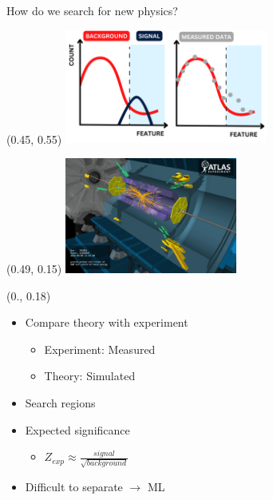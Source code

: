 \documentclass[UKenglish]{beamer}
\begin{document}
\begin{frame}{How do we search for new physics?}

    \begin{textblock}{1}(0.45, 0.55)
        \includegraphics[width = 0.5\textwidth]{figures/DataCompHalf.png}
    \end{textblock}
    \begin{textblock}{1}(0.49, 0.15)
        \includegraphics[width = 0.425\textwidth]{figures/vp1_3dcocktail_run264034_evt11526514_2015-05-06T22-54-50_2}
    \end{textblock}
    \begin{textblock}{0.45}(0., 0.18)
        \begin{itemize}
            \item Compare theory with experiment 
            \begin{itemize}
                \item Experiment: Measured
                \item Theory: Simulated 
                \newline
            \end{itemize}
            \item Search regions
            \item Expected significance
            \begin{itemize}
                \item $Z_{exp}\approx \frac{signal}{\sqrt{background}}$
            \end{itemize}
            \item Difficult to separate $\rightarrow$ ML
        \end{itemize}
    \end{textblock}
\end{frame}
\end{document}
